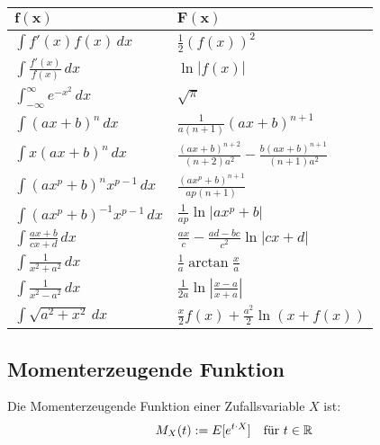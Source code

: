 \begin{center}
  \begin{tabularx}{\linewidth}{>{\centering\arraybackslash}X>{\centering\arraybackslash}X}
    $\mathbf{f(x)}$                        & $\mathbf{F(x)}$                                                  \\
    \midrule
    $\int f'(x) f(x) \, dx$                & $\frac{1}{2}(f(x))^2$                                            \\
    $\int \frac{f'(x)}{f(x)} \, dx$        & $\ln|f(x)|$                                                      \\
    $\int_{-\infty}^\infty e^{-x^2} \, dx$ & $\sqrt{\pi}$                                                     \\
    $\int (ax+b)^n \, dx$                  & $\frac{1}{a(n+1)}(ax+b)^{n+1}$                                   \\
    $\int x(ax+b)^n \, dx$                 & $\frac{(ax+b)^{n+2}}{(n+2)a^2} - \frac{b(ax+b)^{n+1}}{(n+1)a^2}$ \\
    $\int (ax^p+b)^n x^{p-1} \, dx$        & $\frac{(ax^p+b)^{n+1}}{ap(n+1)}$                                 \\
    $\int (ax^p + b)^{-1} x^{p-1} \, dx$   & $\frac{1}{ap} \ln |ax^p + b|$                                    \\
    $\int \frac{ax+b}{cx+d} \, dx$         & $\frac{ax}{c} - \frac{ad-bc}{c^2} \ln |cx +d|$                   \\
    $\int \frac{1}{x^2+a^2} \, dx$         & $\frac{1}{a} \arctan \frac{x}{a}$                                \\
    $\int \frac{1}{x^2 - a^2} \, dx$       & $\frac{1}{2a} \ln\left| \frac{x-a}{x+a} \right|$                 \\
    $\int \sqrt{a^2+x^2} \, dx $           & $\frac{x}{2}f(x) + \frac{a^2}{2}\ln(x+f(x))$                     \\
    \bottomrule
  \end{tabularx}
\end{center}

\subsection*{Momenterzeugende Funktion}
Die Momenterzeugende Funktion einer Zufallsvariable $X$ ist:
\begin{align*}
  M_X (t) := E[e^{t \cdot X}] &  & \text{für } t \in \mathbb{R}
\end{align*}
